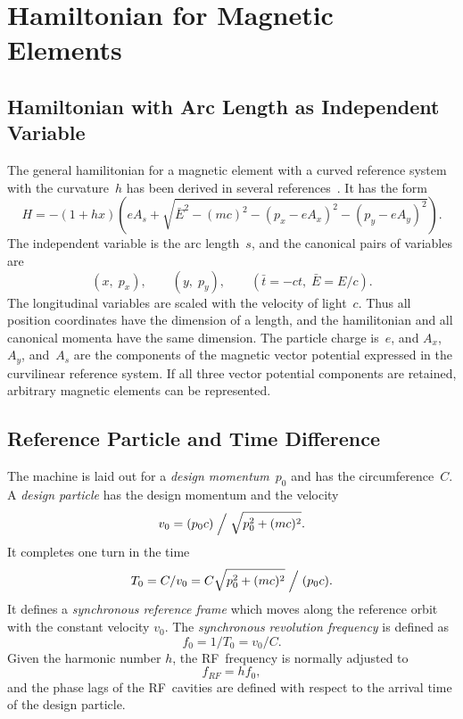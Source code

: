 \documentclass{report}
\begin{document}
\clearpage
\section{Hamiltonian for Magnetic Elements}
\label{sec:hamilton}


\subsection{Hamiltonian with Arc Length as Independent Variable}
The general hamilitonian for a magnetic element with a curved reference
system with the curvature~$h$ has been derived in several
references~\cite{COURANT,DRAGT}.
It has the form
\begin{equation}
  H =-(1+hx)
  \left(
    eA_s + \sqrt{\bar{E}^2-(mc)^2-(p_x-eA_x)^2-(p_y-eA_y)^2}
  \right).
\end{equation}
The independent variable is the arc length~$s$,
and the canonical pairs of variables are
\begin{equation}
  (x,\;p_x), \qquad (y,\;p_y), \qquad (\bar{t}=-ct,\;\bar{E}=E/c).
\end{equation}
The longitudinal variables are scaled with the velocity of light~$c$.
Thus all position coordinates have the dimension of a length,
and the hamilitonian and all canonical momenta have the same dimension.
The particle charge is~$e$, and 
$A_x$,~$A_y$, and~$A_s$ are the components of the magnetic vector
potential expressed in the curvilinear reference system.
If all three vector potential components are retained, 
arbitrary magnetic elements can be represented.


\clearpage
\subsection{Reference Particle and Time Difference}
The machine is laid out for a \textit{design momentum}~$p_0$
and has the circumference~$C$.
A \textit{design particle} has the design momentum and the velocity
\begin{equation}
  v_0 = (p_0 c) \Bigm/ \sqrt{p_0^2+(mc)^2}.
\end{equation}
It completes one turn in the time
\begin{equation}
  T_0 = C / v_0 = C \sqrt{p_0^2+(mc)^2} \Bigm/ (p_0 c).
\end{equation}
It defines a \textit{synchronous reference frame} which moves
along the reference orbit with the constant velocity $v_0$.
The \textit{synchronous revolution frequency} is defined as
\begin{equation}
f_0 = 1 / T_0 = v_0 / C.
\end{equation}
Given the harmonic number $h$, the RF~frequency is normally adjusted to
\begin{equation}
f_{RF} = h f_0,
\end{equation}
and the phase lags of the RF~cavities are defined with respect to the
arrival time of the design particle.
\end{document}
